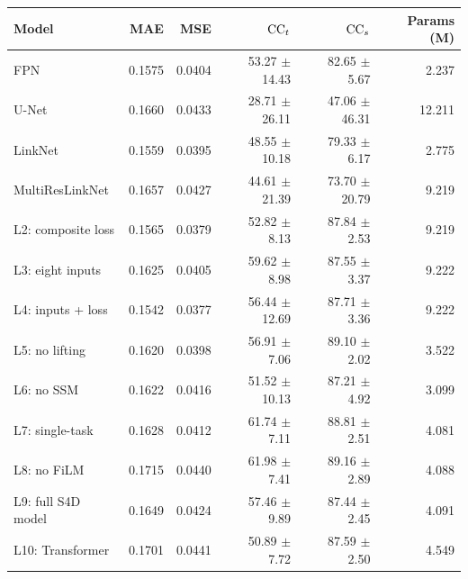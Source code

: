 \begin{tabular}{lrrrrr}\toprule
Model & MAE & MSE & $\mathrm{CC}_{t}$ & $\mathrm{CC}_{s}$ & Params (M)\\\midrule
FPN & 0.1575 & 0.0404 & 53.27 $\pm$ 14.43 & 82.65 $\pm$ 5.67 & 2.237 \\
U-Net & 0.1660 & 0.0433 & 28.71 $\pm$ 26.11 & 47.06 $\pm$ 46.31 & 12.211 \\
LinkNet & 0.1559 & 0.0395 & 48.55 $\pm$ 10.18 & 79.33 $\pm$ 6.17 & 2.775 \\
MultiResLinkNet & 0.1657 & 0.0427 & 44.61 $\pm$ 21.39 & 73.70 $\pm$ 20.79 & 9.219 \\
L2: composite loss & 0.1565 & 0.0379 & 52.82 $\pm$ 8.13 & 87.84 $\pm$ 2.53 & 9.219 \\
L3: eight inputs & 0.1625 & 0.0405 & 59.62 $\pm$ 8.98 & 87.55 $\pm$ 3.37 & 9.222 \\
L4: inputs + loss & 0.1542 & 0.0377 & 56.44 $\pm$ 12.69 & 87.71 $\pm$ 3.36 & 9.222 \\
L5: no lifting & 0.1620 & 0.0398 & 56.91 $\pm$ 7.06 & 89.10 $\pm$ 2.02 & 3.522 \\
L6: no SSM & 0.1622 & 0.0416 & 51.52 $\pm$ 10.13 & 87.21 $\pm$ 4.92 & 3.099 \\
L7: single-task & 0.1628 & 0.0412 & 61.74 $\pm$ 7.11 & 88.81 $\pm$ 2.51 & 4.081 \\
L8: no FiLM & 0.1715 & 0.0440 & 61.98 $\pm$ 7.41 & 89.16 $\pm$ 2.89 & 4.088 \\
L9: full S4D model & 0.1649 & 0.0424 & 57.46 $\pm$ 9.89 & 87.44 $\pm$ 2.45 & 4.091 \\
L10: Transformer & 0.1701 & 0.0441 & 50.89 $\pm$ 7.72 & 87.59 $\pm$ 2.50 & 4.549 \\
\bottomrule\end{tabular}
